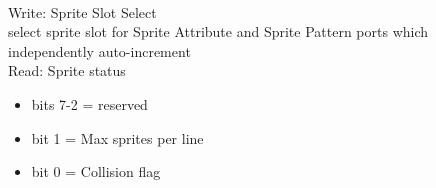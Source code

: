 \\
Write: Sprite Slot Select\\
select sprite slot for Sprite Attribute and Sprite Pattern ports which
independently auto-increment\\
Read: Sprite status
\begin{itemize}
\item[] bits 7-2 = reserved
\item[] bit 1 = Max sprites per line
\item[] bit 0 = Collision flag
\end{itemize}

